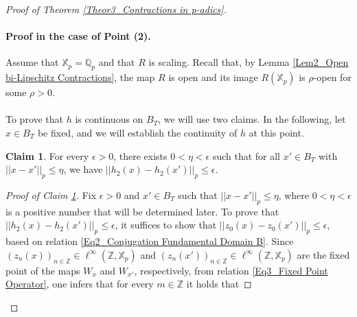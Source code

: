 \documentclass[a4paper, 12pt]{article}
\theoremstyle{definition}
\newtheorem{claim}{Claim}[section]
\begin{document}
\begin{proof}[Proof of Theorem \ref{Theor3_Contractions in p-adics}]
		
		
		
		\paragraph{Proof in the case of Point (2).} Assume that $\mathbb{X}_{p} = \mathbb{Q}_{p}$ and that $R$ is scaling. Recall that, by Lemma \ref{Lem2_Open bi-Lipschitz Contractions}, the map $R$ is open and its image $R \left(  \mathbb{X}_{p}  \right) $ is $\rho$-open for some $\rho  > 0$. 
		
		
		
		
		
		\paragraph{} 	
		
		To prove that $h$ is continuous on $B_{T}$, we will use two claims. In the following, let $x \in B_{T}$ be fixed, and we will establish the continuity of $h$ at this point.
		
		\begin{claim}\label{Claim3 Homeomorphism 2 on B_T}
			For every $ \epsilon  > 0$, there exists $ 0 <  \eta <  \epsilon $ such that for all $x' \in B_{T}$ with $ \left| \left|  x - x'  \right|  \right|_{p} \le  \eta $, we have $  \left| \left|  h_{2} \left(  x  \right)   - h_{2} \left(  x'  \right)   \right|  \right|_{p}  \le  \epsilon $. 
			
		\end{claim}
		
		\begin{proof}[Proof of Claim \ref{Claim3 Homeomorphism 2 on B_T}]
			
			Fix $  \epsilon  > 0$ and $x' \in B_{T}$ such that $ \left| \left|  x - x'  \right|  \right|_{p} \le  \eta $, where $ 0 <  \eta <  \epsilon $ is a positive number that will be determined later. 
			To prove that $ \left| \left|  h_{2}(x) - h_{2} \left(  x'  \right)   \right|  \right|_{p} \le  \epsilon $, it suffices to show that $ \left| \left|  z_{0}(x) - z_{0} \left(  x'  \right)   \right|  \right|_{p} \le  \epsilon $, based on relation \eqref{Eq2_Conjugation Fundamental Domain B}.    
			Since $ \left(  z_{n} \left(  x  \right)    \right)_{n \in \mathbb{Z} } \in \ell^{ \infty } \left(  \mathbb{Z} , \mathbb{X}_{p}  \right) $ and $ \left(  z_{n} \left(  x'  \right)    \right)_{n \in \mathbb{Z} } \in \ell^{ \infty } \left(  \mathbb{Z} , \mathbb{X}_{p}  \right) $ are the fixed point of the maps $W_{x}$ and $W_{x'}$, respectively, from relation \eqref{Eq3_Fixed Point Operator}, one infers that for every $m \in \mathbb{Z} $ it holds that
			

\end{proof}
\end{proof}
\end{document}

